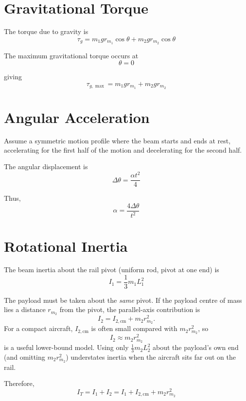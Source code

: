 \documentclass[11pt]{article}
\begin{document}
\section{Gravitational Torque}

The torque due to gravity is
\[
    \tau_g = m_1 g r_{m_1}\cos\theta
           + m_2 g r_{m_2}\cos\theta
\]

The maximum gravitational torque occurs at
\[
    \theta = 0
\]

giving
\[
    \tau_{g,\max}
    = m_1 g r_{m_1} + m_2 g r_{m_2}
\]

\section{Angular Acceleration}

Assume a symmetric motion profile where the beam starts and
ends at rest, accelerating for the first half of the motion
and decelerating for the second half.

The angular displacement is
\[
    \Delta\theta = \frac{\alpha t^2}{4}
\]

Thus,
\[
    \boxed{
        \alpha = \frac{4\Delta\theta}{t^2}
    }
\]

\section{Rotational Inertia}

The beam inertia about the rail pivot (uniform rod, pivot at one end) is
\[
    I_1 = \frac{1}{3}m_1 L_1^2
\]

The payload must be taken about the \emph{same} pivot. If the payload centre of mass
lies a distance $r_{m_2}$ from the pivot, the parallel-axis contribution is
\[
    I_2 = I_{2,\mathrm{cm}} + m_2 r_{m_2}^2.
\]
For a compact aircraft, $I_{2,\mathrm{cm}}$ is often small compared with $m_2 r_{m_2}^2$, so
\[
    I_2 \approx m_2 r_{m_2}^2
\]
is a useful lower-bound model. Using only $\frac{1}{3}m_2 L_2^2$ about the payload's own
end (and omitting $m_2 r_{m_2}^2$) understates inertia when the aircraft sits far out on the rail.

Therefore,
\[
    \boxed{
        I_T = I_1 + I_2
        = I_1 + I_{2,\mathrm{cm}} + m_2 r_{m_2}^2
    }
\]
\end{document}
